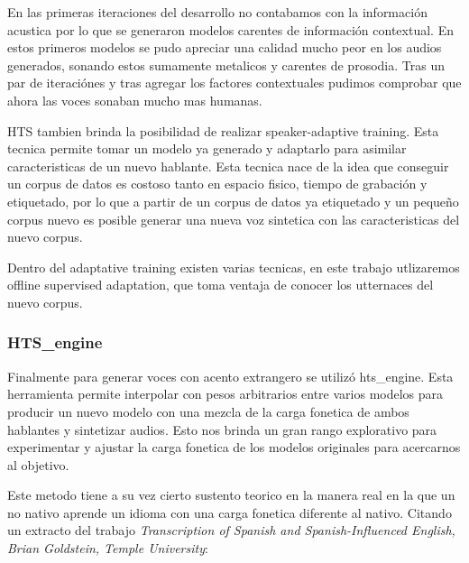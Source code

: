 En las primeras iteraciones del desarrollo no contabamos con la información acustica por lo que se generaron modelos carentes de información contextual. En estos primeros modelos se pudo apreciar una calidad mucho peor en los audios generados, sonando estos sumamente metalicos y carentes de prosodia. Tras un par de iteraciónes y tras agregar los factores contextuales pudimos comprobar que ahora las voces sonaban mucho mas humanas.

HTS tambien brinda la posibilidad de realizar speaker-adaptive training. Esta tecnica permite tomar un modelo ya generado y adaptarlo para asimilar caracteristicas de un nuevo hablante. Esta tecnica nace de la idea que conseguir un corpus de datos es costoso tanto en espacio fisico, tiempo de grabación y etiquetado, por lo que a partir de un corpus de datos ya etiquetado y un pequeño corpus nuevo es posible generar una nueva voz sintetica con las caracteristicas del nuevo corpus.

Dentro del adaptative training existen varias tecnicas, en este trabajo utlizaremos offline supervised adaptation, que toma ventaja \dafuk de conocer los utternaces del nuevo corpus. 


\subsubsection{HTS\_engine}

Finalmente para generar voces con acento extrangero se utilizó hts\_engine. Esta herramienta permite interpolar con pesos arbitrarios entre varios modelos para producir un nuevo modelo con una mezcla de la carga fonetica de ambos hablantes y sintetizar audios. Esto nos brinda un gran rango explorativo para experimentar y ajustar la carga fonetica de los modelos originales para acercarnos al objetivo. 


Este metodo tiene a su vez cierto sustento teorico en la manera real en la que un no nativo aprende un idioma con una carga fonetica diferente al nativo. Citando un extracto del trabajo \textit{Transcription of Spanish and Spanish-Influenced English, Brian Goldstein, Temple University}:

